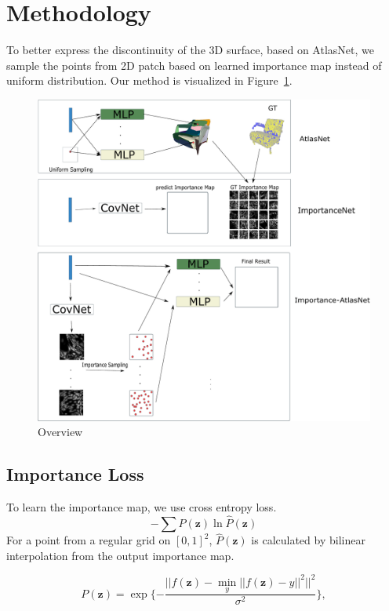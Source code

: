 \section{Methodology}
To better express the discontinuity of the 3D surface, based on AtlasNet, we sample the points from 2D patch based on learned importance map instead of uniform distribution. Our method is visualized in Figure~\ref{fig:overview}.

\begin{figure}[t]
	\begin{center}
		\includegraphics[width=0.8\linewidth]{img/overview}
	\end{center}
	\caption{Overview}
	\label{fig:overview}
\end{figure}

\subsection{Importance Loss}
To learn the importance map, we use cross entropy loss.
\begin{equation}
-\sum P(\mathbf{z}) \ln \hat{P}(\mathbf{z})
\end{equation}
For a point from a regular grid on $[0,1]^2$, $\hat{P}(\mathbf{z})$ is calculated by bilinear interpolation from the output importance map.

\begin{equation}
P(\mathbf{z}) = \exp\{-\frac{|| f(\mathbf{z}) - \min_{y}||f(\mathbf{z}) - y||^2 ||^2}{\sigma^2}  \},
\end{equation}

